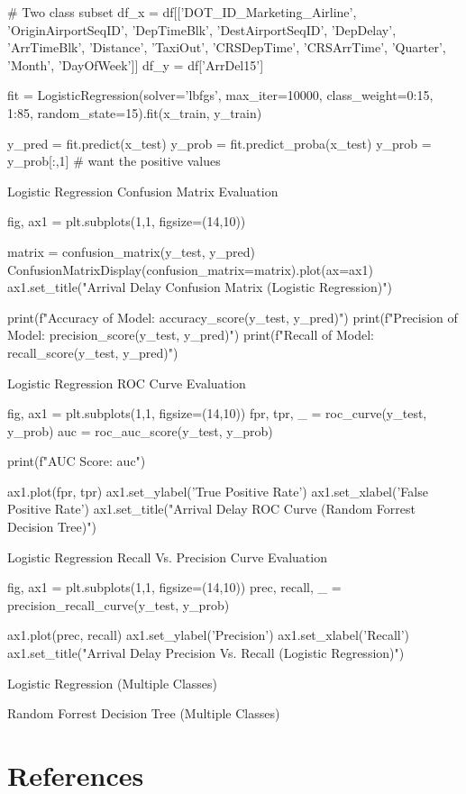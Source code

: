 \documentclass[a4paper,12pt]{article}
\begin{document}
\begin{python}
# Two class subset
df_x = df[['DOT_ID_Marketing_Airline', 'OriginAirportSeqID', 'DepTimeBlk', 'DestAirportSeqID', 'DepDelay', 'ArrTimeBlk', 'Distance', 'TaxiOut', 'CRSDepTime',
 'CRSArrTime', 'Quarter', 'Month', 'DayOfWeek']]
df_y = df['ArrDel15']

fit = LogisticRegression(solver='lbfgs', max_iter=10000, class_weight={0:15, 1:85}, random_state=15).fit(x_train, y_train)

y_pred = fit.predict(x_test)
y_prob = fit.predict_proba(x_test)
y_prob = y_prob[:,1] # want the positive values
\end{python}

Logistic Regression Confusion Matrix Evaluation

\begin{python}
fig, ax1 = plt.subplots(1,1, figsize=(14,10))

matrix = confusion_matrix(y_test, y_pred)
ConfusionMatrixDisplay(confusion_matrix=matrix).plot(ax=ax1)
ax1.set_title("Arrival Delay Confusion Matrix (Logistic Regression)")

print(f"Accuracy of Model: {accuracy_score(y_test, y_pred)}")
print(f"Precision of Model: {precision_score(y_test, y_pred)}")
print(f"Recall of Model: {recall_score(y_test, y_pred)}")
\end{python}

Logistic Regression ROC Curve Evaluation
\begin{python}
fig, ax1 = plt.subplots(1,1, figsize=(14,10))
fpr, tpr, _ = roc_curve(y_test, y_prob)
auc = roc_auc_score(y_test, y_prob)

print(f"AUC Score: {auc}")

ax1.plot(fpr, tpr)
ax1.set_ylabel('True Positive Rate')
ax1.set_xlabel('False Positive Rate')
ax1.set_title("Arrival Delay ROC Curve (Random Forrest Decision Tree)")
\end{python}

Logistic Regression Recall Vs. Precision Curve Evaluation
\begin{python}
fig, ax1 = plt.subplots(1,1, figsize=(14,10))
prec, recall, _ = precision_recall_curve(y_test, y_prob)

ax1.plot(prec, recall)
ax1.set_ylabel('Precision')
ax1.set_xlabel('Recall')
ax1.set_title("Arrival Delay Precision Vs. Recall (Logistic Regression)")
\end{python}

Logistic Regression (Multiple Classes)

Random Forrest Decision Tree (Multiple Classes)


\pagebreak


\section{References}


\end{document}
